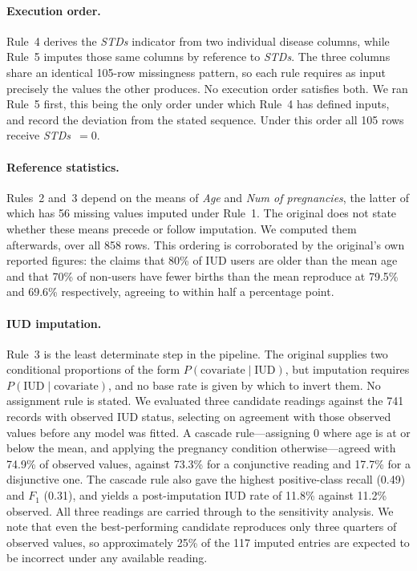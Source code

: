 \paragraph{Execution order.} Rule~4 derives the \emph{STDs} indicator from two
individual disease columns, while Rule~5 imputes those same columns by
reference to \emph{STDs}. The three columns share an identical 105-row
missingness pattern, so each rule requires as input precisely the values the
other produces. No execution order satisfies both. We ran Rule~5 first, this
being the only order under which Rule~4 has defined inputs, and record the
deviation from the stated sequence. Under this order all 105 rows receive
\emph{STDs}~$=0$.

\paragraph{Reference statistics.} Rules~2 and~3 depend on the means of
\emph{Age} and \emph{Num of pregnancies}, the latter of which has 56 missing
values imputed under Rule~1. The original does not state whether these means
precede or follow imputation. We computed them afterwards, over all 858 rows.
This ordering is corroborated by the original's own reported figures: the
claims that 80\% of IUD users are older than the mean age and that 70\% of
non-users have fewer births than the mean reproduce at 79.5\% and 69.6\%
respectively, agreeing to within half a percentage point.

\paragraph{IUD imputation.} Rule~3 is the least determinate step in the
pipeline. The original supplies two conditional proportions of the form
$P(\text{covariate} \mid \text{IUD})$, but imputation requires
$P(\text{IUD} \mid \text{covariate})$, and no base rate is given by which to
invert them. No assignment rule is stated. We evaluated three candidate
readings against the 741 records with observed IUD status, selecting on
agreement with those observed values before any model was fitted. A cascade
rule---assigning $0$ where age is at or below the mean, and applying the
pregnancy condition otherwise---agreed with 74.9\% of observed values, against
73.3\% for a conjunctive reading and 17.7\% for a disjunctive one. The cascade
rule also gave the highest positive-class recall (0.49) and $F_1$ (0.31), and
yields a post-imputation IUD rate of 11.8\% against 11.2\% observed. All three
readings are carried through to the sensitivity analysis. We note that even the
best-performing candidate reproduces only three quarters of observed values, so
approximately 25\% of the 117 imputed entries are expected to be incorrect
under any available reading.


